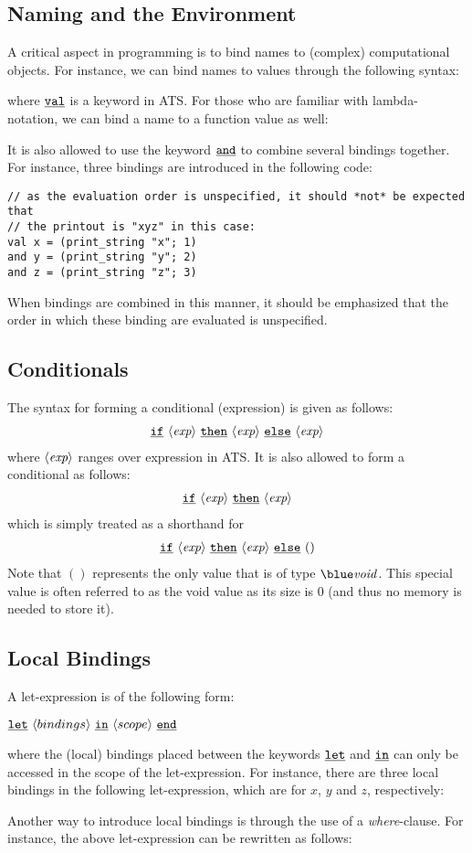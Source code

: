 \subsection{Naming and the Environment}
A critical aspect in programming is to bind names to (complex)
computational objects. For instance, we can bind names to values through
the following syntax:

where $\underline{\texttt{val}}$ is a keyword in ATS.  For those who are familiar with
lambda-notation, we can bind a name to a function value as well:

It is also allowed to use the keyword $\underline{\texttt{and}}$ to combine several bindings
together. For instance, three bindings are introduced in the following
code:
\begin{verbatim}
// as the evaluation order is unspecified, it should *not* be expected that
// the printout is "xyz" in this case:
val x = (print_string "x"; 1)
and y = (print_string "y"; 2)
and z = (print_string "z"; 3)
\end{verbatim}
When bindings are combined in this manner, it should be emphasized that
the order in which these binding are evaluated is unspecified.



\subsection{Conditionals}
The syntax for forming a conditional (expression) is given as follows:
\[\begin{array}{c}
\underline{\texttt{if}}~\langle\mbox{\it exp}\rangle~\underline{\texttt{then}}~\langle\mbox{\it exp}\rangle~\underline{\texttt{else}}~\langle\mbox{\it exp}\rangle
\end{array}\]
where $\langle\mbox{\it exp}\rangle$ ranges over expression in ATS. It is also
allowed to form a conditional as follows:
\[\begin{array}{c}
\underline{\texttt{if}}~\langle\mbox{\it exp}\rangle~\underline{\texttt{then}}~\langle\mbox{\it exp}\rangle
\end{array}\]
which is simply treated as a shorthand for
\[\begin{array}{c}
\underline{\texttt{if}}~\langle\mbox{\it exp}\rangle~\underline{\texttt{then}}~\langle\mbox{\it exp}\rangle~\underline{\texttt{else}}~()
\end{array}\]
Note that $()$ represents the only value that is of type ${\it\blue
void}$. This special value is often referred to as the void value as its
size is $0$ (and thus no memory is needed to store it).

\subsection{Local Bindings}
A let-expression is of the following form:
\begin{center}
\mbox{$\underline{\texttt{let}}~\langle bindings\rangle~\underline{\texttt{in}}~\langle scope\rangle~\underline{\texttt{end}}$}
\end{center}
where the (local) bindings placed between the keywords $\underline{\texttt{let}}$ and $\underline{\texttt{in}}$
can only be accessed in the scope of the let-expression. For instance,
there are three local bindings in the following let-expression, which are for
$x$, $y$ and $z$, respectively:

Another way to introduce local bindings is through the use of a {\it
where}-clause. For instance, the above let-expression can be rewritten as
follows:


